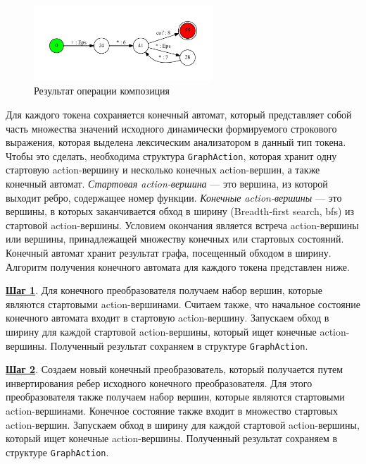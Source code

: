 \begin{figure}[h!]
\begin{center}
\includegraphics[width=0.6\textwidth]{Polubelova/calc_ex_compose}
\caption{Результат операции композиция}
\label{fig:calc_ex_compose} 
\end{center}
\end{figure}
Для каждого токена сохраняется конечный автомат, который представляет собой часть множества значений исходного динамически формируемого строкового выражения, которая выделена лексическим анализатором в данный тип токена. Чтобы это сделать, необходима структура \verb|GraphAction|, которая хранит одну стартовую action-вершину и несколько конечных action-вершин, а также конечный автомат. \textit{Стартовая action-вершина} --- это вершина, из которой выходит ребро, содержащее номер функции. \textit{Конечные action-вершины} --- это вершины, в которых заканчивается обход в ширину (Breadth-first search, bfs) из стартовой action-вершины. Условием окончания является встреча action-вершины или вершины, принадлежащей множеству конечных или стартовых состояний. Конечный автомат хранит результат графа, посещенный обходом в ширину. Алгоритм получения конечного автомата для каждого токена представлен ниже.

\textbf{\underline{Шаг 1}}. Для конечного преобразователя получаем набор вершин, которые являются стартовыми action-вершинами. Считаем также, что начальное состояние конечного автомата входит в стартовую action-вершину. Запускаем обход в ширину для каждой стартовой action-вершины, который ищет конечные action-вершины. Полученный результат сохраняем в структуре \verb|GraphAction|.  

\textbf{\underline{Шаг 2}}. Создаем новый конечный преобразователь, который получается путем инвертирования ребер исходного конечного преобразователя. Для этого преобразователя также получаем набор вершин, которые являются стартовыми action-вершинами. Конечное состояние также входит в множество стартовых action-вершин. Запускаем обход в ширину для каждой стартовой action-вершины, который ищет конечные action-вершины. Полученный результат сохраняем в структуре \verb|GraphAction|. 

